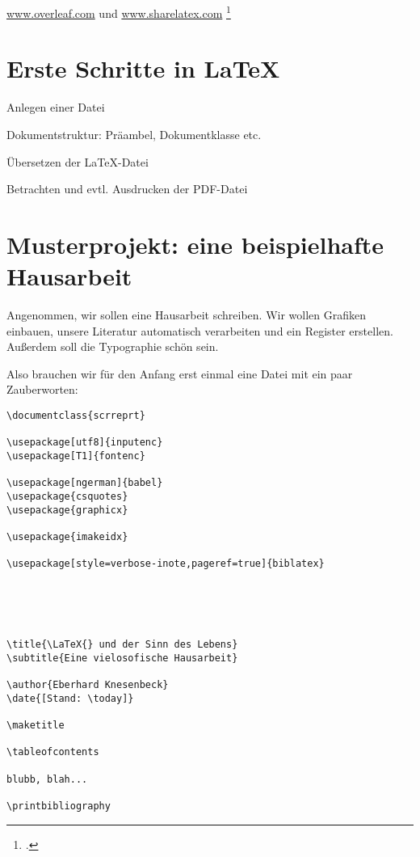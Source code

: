 \url{www.overleaf.com}  und \url{www.sharelatex.com} 
\footcite{meyer:dtk2015/1}



\section{Erste Schritte in \LaTeX}

Anlegen einer Datei

Dokumentstruktur: Präambel, Dokumentklasse etc.

Übersetzen der \LaTeX{}-Datei

Betrachten und evtl. Ausdrucken der PDF-Datei


\section{Musterprojekt: eine beispielhafte Hausarbeit}

Angenommen, wir sollen eine Hausarbeit schreiben.
Wir wollen Grafiken einbauen, unsere Literatur automatisch verarbeiten und ein Register erstellen.
Außerdem soll die Typographie schön sein.

Also brauchen wir für den Anfang erst einmal eine Datei mit ein paar Zauberworten:



\begin{lstlisting}
\documentclass{scrreprt}
 
\usepackage[utf8]{inputenc}
\usepackage[T1]{fontenc}

\usepackage[ngerman]{babel}
\usepackage{csquotes}
\usepackage{graphicx}

\usepackage{imakeidx}

\usepackage[style=verbose-inote,pageref=true]{biblatex}





\title{\LaTeX{} und der Sinn des Lebens}
\subtitle{Eine vielosofische Hausarbeit}

\author{Eberhard Knesenbeck}
\date{[Stand: \today]}

\maketitle

\tableofcontents

blubb, blah...

\printbibliography

\end{lstlisting}

